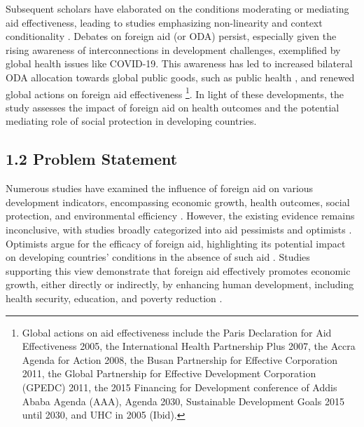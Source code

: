 Subsequent scholars have elaborated on the conditions moderating or mediating aid effectiveness, leading to studies emphasizing non-linearity and context conditionality \parencite[see]{yontcheva_macroeconomic_2006}. Debates on foreign aid (or ODA) persist, especially given the rising awareness of interconnections in development challenges, exemplified by global health issues like COVID-19. This awareness has led to increased bilateral ODA allocation towards global public goods, such as public health \parencite{cepparulo_responses_2016, kenny_official_2020}, and renewed global actions on foreign aid effectiveness \parencite{cassola_evaluating_2022, ogbuoji_aid_2018} \footnote{Global actions on aid effectiveness include the Paris Declaration for Aid Effectiveness 2005, the International Health Partnership Plus 2007, the Accra Agenda for Action 2008, the Busan Partnership for Effective Corporation 2011, the Global Partnership for Effective Development Corporation (GPEDC) 2011, the 2015 Financing for Development conference of Addis Ababa Agenda (AAA), Agenda 2030, Sustainable Development Goals 2015 until 2030, and UHC in 2005 (Ibid).}. In light of these developments, the study assesses the impact of foreign aid on health outcomes and the potential mediating role of social protection in developing countries.

\subsection*{1.2 \quad	Problem Statement}
Numerous studies have examined the influence of foreign aid on various development indicators, encompassing economic growth, health outcomes, social protection, and environmental efficiency \parencite{cassola_evaluating_2022, easterly_can_2009, milton_foreign_1958, nino-zarazua_aids_2023, nwude_official_2020, yan_mortality_2015}. However, the existing evidence remains inconclusive, with studies broadly categorized into aid pessimists and optimists \parencite{kavanagh_governance_2019, nwude_official_2020}. Optimists argue for the efficacy of foreign aid, highlighting its potential impact on developing countries' conditions in the absence of such aid \parencite{sachs_case_2014}. Studies supporting this view demonstrate that foreign aid effectively promotes economic growth, either directly or indirectly, by enhancing human development, including health security, education, and poverty reduction \parencite{bavinger_relationship_2017, doucouliagos_health_2021, marty_taking_2017, mohamed_foreign_2017}.

